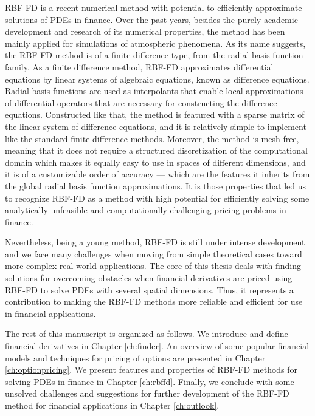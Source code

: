 \documentclass{UUThesisTemplate}
\begin{document}
\par RBF-FD is a recent numerical method with potential to efficiently approximate solutions of PDEs in finance. Over the past years, besides the purely academic development and research of its numerical properties, the method has been mainly applied for simulations of atmospheric phenomena. As its name suggests, the RBF-FD method is of a finite difference type, from the radial basis function family. As a finite difference method, RBF-FD approximates differential equations by linear systems of algebraic equations, known as difference equations. Radial basis functions are used as interpolants that enable local approximations of differential operators that are necessary for constructing the difference equations. Constructed like that, the method is featured with a sparse matrix of the linear system of difference equations, and it is relatively simple to implement like the standard finite difference methods. Moreover, the method is mesh-free, meaning that it does not require a structured discretization of the computational domain which makes it equally easy to use in spaces of different dimensions, and it is of a customizable order of accuracy --- which are the features it inherits from the global radial basis function approximations. It is those properties that led us to recognize RBF-FD as a method with high potential for efficiently solving some analytically unfeasible and computationally challenging pricing problems in finance.
\par Nevertheless, being a young method, RBF-FD is still under intense development and we face many challenges when moving from simple theoretical cases toward more complex real-world applications. The core of this thesis deals with finding solutions for overcoming obstacles when financial derivatives are priced using RBF-FD to solve PDEs with several spatial dimensions. Thus, it represents a contribution to making the RBF-FD methods more reliable and efficient for use in financial applications. 
\par The rest of this manuscript is organized as follows. We introduce and define financial derivatives in Chapter \ref{ch:finder}. An overview of some popular financial models and techniques for pricing of options are presented in Chapter \ref{ch:optionpricing}. We present features and properties of RBF-FD methods for solving PDEs in finance in Chapter \ref{ch:rbffd}. Finally, we conclude with some unsolved challenges and suggestions for further development of the RBF-FD method for financial applications in Chapter \ref{ch:outlook}.
%
%
\end{document}
